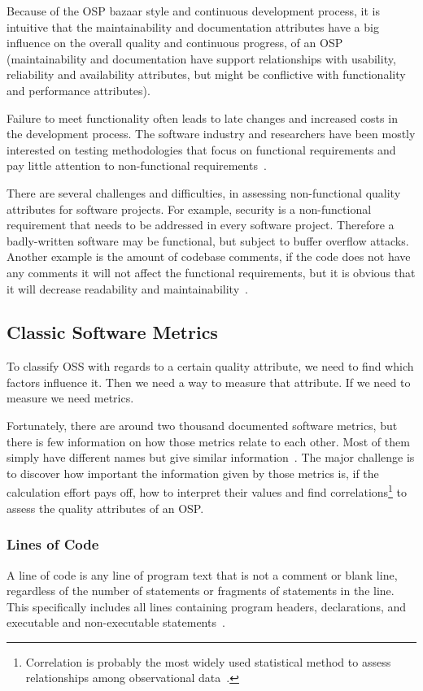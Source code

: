 \documentclass[sle]{llncs}
\begin{document}
Because of the OSP bazaar style and continuous development process, it is intuitive that the maintainability and documentation attributes 
have a big influence on the overall quality and continuous progress, of an OSP
(maintainability and documentation have support relationships
with usability, reliability and availability attributes, but might be conflictive with functionality and performance attributes).

Failure to meet functionality often leads to late changes and increased costs in the development process.
The software industry and researchers have been mostly interested on testing methodologies 
that focus on functional requirements and pay little attention to non-functional requirements~\cite{chung2009non}.

There are several challenges and difficulties, in assessing non-functional quality attributes for software projects.
For example, security is a non-functional requirement that needs to be addressed in every software project. 
Therefore a badly-written software may be functional, but subject to buffer overflow attacks.
Another example is the amount of codebase comments, if the code does not have any comments it will not affect the functional requirements, 
but it is obvious that it will decrease readability and maintainability~\cite{gousios2007software}. 

\subsection{Classic Software Metrics}
To classify OSS with regards to a certain quality attribute, we need to find which factors influence it. 
Then we need a way to measure that attribute. If we need to measure we need metrics.

Fortunately, there are around two thousand documented software metrics, but there is few information on how those metrics relate to each other. 
Most of them simply have different names but give similar information~\cite{fenton1999software}.
The major challenge is to discover how important the information given by those metrics is, if the calculation effort pays off,
how to interpret their values and find 
\textsf{correlations}\footnote{Correlation is probably the most widely used statistical method to assess relationships among observational data~\cite{kan2002metrics}.} 
 to assess the quality attributes of an OSP.

\subsubsection{Lines of Code}
A line of code is any line of program text that is not a comment or blank line, 
regardless of the number of statements or fragments of statements in the line. 
This specifically includes all lines containing program headers, declarations, and executable and non-executable statements~\cite{conte1986software}.
\end{document}
